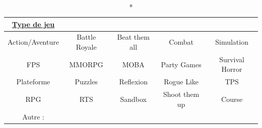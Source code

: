 \documentclass{article}
\begin{document}
\begin{longtable}{|c|c|c|c|c|}
    \caption*{\textbf{\uline{Type de jeu}}}\\
    \hline
    \cellcolor{lightblue}Action/Aventure & Battle Royale & Beat them all & Combat & Simulation\\
    \hline
    \cellcolor{lightblue}FPS & MMORPG & MOBA & Party Games & Survival Horror\\
    \hline
    Plateforme & Puzzles & Reflexion & Rogue Like & TPS\\
    \hline
    \cellcolor{lightblue}RPG & RTS & Sandbox & Shoot them up & Course\\
    \hline
    Autre : & \multicolumn{4}{|c|}{}\\
    \hline
\end{longtable}
\end{document}
